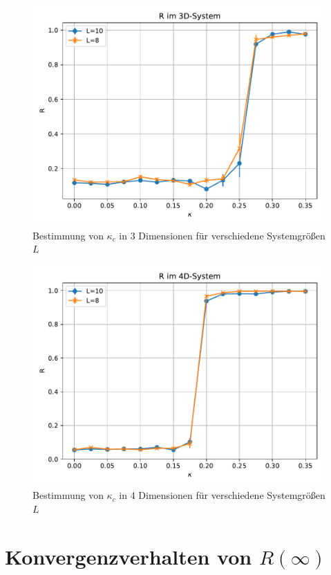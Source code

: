 \documentclass[10pt,a4paper]{article}
\begin{document}
\begin{figure}
  \centering
  \includegraphics[width=\textwidth]{../figures/3dR.pdf}
  \caption{Bestimmung von $\kappa_c$ in 3 Dimensionen für verschiedene Systemgrößen $L$}\label{fig:3d}
\end{figure}

\begin{figure}
  \centering
  \includegraphics[width=\textwidth]{../figures/4dR.pdf}
  \caption{Bestimmung von $\kappa_c$ in 4 Dimensionen für verschiedene Systemgrößen $L$}\label{fig:4d}
\end{figure}

\section{Konvergenzverhalten von $R(\infty)$}
\end{document}
